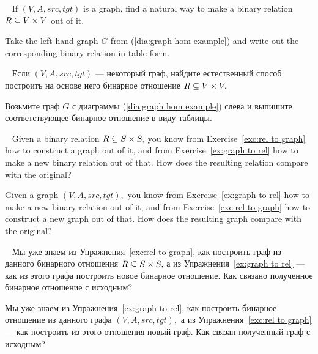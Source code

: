 \documentclass[../main/CT4S-EN-RU]{subfiles}
\begin{document}
\begin{exerciseENG}\label{ex:graph to rel}~
\sexc If $(V,A,src,tgt)$ is a graph, find a natural way to make a binary relation $R\ss V\times V$ out of it. 
\item Take the left-hand graph $G$ from (\ref{dia:graph hom example}) and write out the corresponding binary relation in table form.
\endsexc
\end{exerciseENG}

\begin{exerciseRUS}\label{ex:graph to rel}~
\sexc Если $(V,A,src,tgt)$ — некоторый граф, найдите естественный способ построить на основе него бинарное отношение $R\ss V\times V.$ 
\item Возьмите граф $G$ с диаграммы (\ref{dia:graph hom example}) слева и выпишите соответствующее бинарное отношение в виду таблицы.
\endsexc
\end{exerciseRUS}

\begin{exerciseENG}~
\sexc Given a binary relation $R\ss S\times S,$ you know from Exercise~\ref{exc:rel to graph} how to construct a graph out of it, and from Exercise~\ref{ex:graph to rel} how to make a new binary relation out of that. How does the resulting relation compare with the original?
\item Given a graph $(V,A,src,tgt),$ you know from Exercise~\ref{ex:graph to rel} how to make a new binary relation out of it, and from Exercise~\ref{exc:rel to graph} how to construct a new graph out of that. How does the resulting graph compare with the original? 
\endsexc
\end{exerciseENG}

\begin{exerciseRUS}~
\sexc Мы уже знаем из Упражнения~\ref{exc:rel to graph}, как построить граф из данного бинарного отношения $R\ss S\times S,$ а из Упражнения~\ref{ex:graph to rel} — как из этого графа построить новое бинарное отношение. Как связано полученное бинарное отношение с исходным?
\item Мы уже знаем из Упражнения~\ref{ex:graph to rel}, как построить бинарное отношение из данного графа $(V,A,src,tgt),$ а из Упражнения~\ref{exc:rel to graph} — как построить из этого отношения новый граф. Как связан полученный граф с исходным? 
\endsexc
\end{exerciseRUS}
\end{document}
